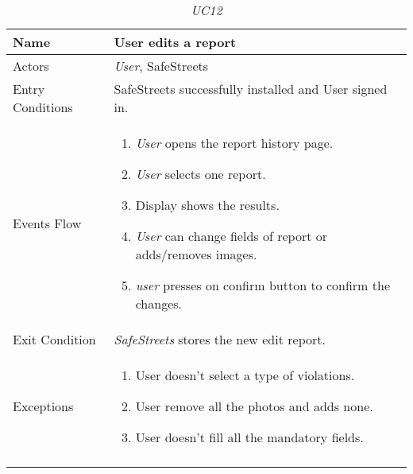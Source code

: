 \documentclass[../../../RASD.tex]{subfiles}
\begin{document}
    \begin{center}
        \begin{longtable}{| p{.35\linewidth} | p{.65\linewidth} |}
            \hline
            \textbf{Name} & \textbf{User edits a report}\\ \hline
            Actors & \textit{User}, SafeStreets\\ \hline
            Entry Conditions & SafeStreets successfully installed and User signed in.\\ \hline
            Events Flow &
            \begin{enumerate}
                \item \textit{User} opens the report history page.
                \item \textit{User} selects one report.
                \item  Display shows the results.
                \item \textit{User} can change fields of report or adds/removes images.
                \item \textit{user} presses on confirm button to confirm the changes.
            \end{enumerate}
            \\ \hline
            Exit Condition & \textit{SafeStreets} stores the new edit report.\\ \hline
            Exceptions &
            \begin{enumerate}
                \item User doesn’t select a type of violations.
                \item User remove all the photos and adds none.
                \item User doesn’t fill all the mandatory fields.
            \end{enumerate}
            \\
            \hline
            \caption[\textit{Use Case 12}]{\textit{UC12}}
        \end{longtable}
    \end{center}
\newpage
\end{document}
